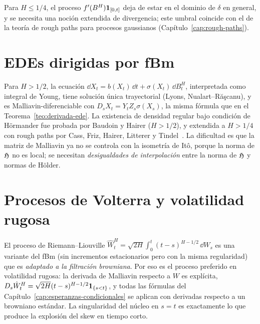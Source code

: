 Para $H\le1/4$, el proceso $f'(B^H)\mathbf{1}_{[0,t]}$ deja de estar en el dominio de $\delta$ en general, y se
necesita una noción extendida de divergencia; este umbral coincide con el de la teoría de rough
paths para procesos gaussianos (Capítulo~\ref{cap:rough-paths}).

\section{EDEs dirigidas por fBm}
Para $H>1/2$, la ecuación $\dd X_t=b(X_t)\,\dd t+\sigma(X_t)\,\dd B^H_t$, interpretada como integral de Young,
tiene solución única trayectorial (Lyons, Nualart--Răşcanu), y es Malliavin-diferenciable con
$D_sX_t=Y_tZ_s\sigma(X_s)$, la misma fórmula que en el Teorema~\ref{teo:derivada-ede}. La existencia de densidad regular
bajo condición de Hörmander fue probada por Baudoin y Hairer ($H>1/2$), y extendida a
$H>1/4$ con rough paths por Cass, Friz, Hairer, Litterer y Tindel~\cite{CassHairerLittererTindel15}. La dificultad es que la
matriz de Malliavin ya no se controla con la isometría de Itô, porque la norma de $\mathfrak{H}$ no es local;
se necesitan \emph{desigualdades de interpolación} entre la norma de $\mathfrak{H}$ y normas de Hölder.

\section{Procesos de Volterra y volatilidad rugosa}
El proceso de Riemann--Liouville $\hat W^H_t=\sqrt{2H}\int_0^t(t-s)^{H-1/2}\,\dd W_s$ es una variante del fBm
(sin incrementos estacionarios pero con la misma regularidad) que es \emph{adaptado a la filtración
browniana}. Por eso es el proceso preferido en volatilidad rugosa: la derivada de Malliavin
respecto a $W$ es explícita, $D_s\hat W^H_t=\sqrt{2H}(t-s)^{H-1/2}\mathbf{1}_{\{s<t\}}$, y todas las fórmulas del Capítulo~\ref{cap:esperanzas-condicionales}
se aplican con derivadas respecto a un browniano estándar. La singularidad del núcleo en $s=t$
es exactamente lo que produce la explosión del skew en tiempo corto.
